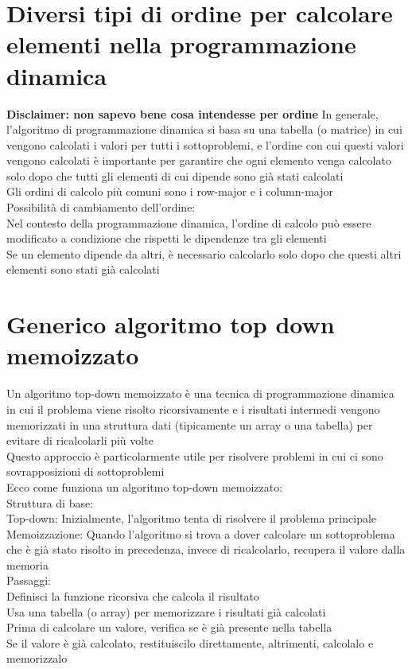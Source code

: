 \documentclass[12pt,oneside,a4paper]{article}
\begin{document}
\section{Diversi tipi di ordine per calcolare elementi nella programmazione dinamica}
\textbf{Disclaimer: non sapevo bene cosa intendesse per ordine}
In generale, l'algoritmo di programmazione dinamica si basa su una tabella (o matrice) in cui vengono calcolati i valori per tutti i sottoproblemi, e l'ordine con cui questi valori vengono calcolati è importante per garantire che ogni elemento venga calcolato solo dopo che tutti gli elementi di cui dipende sono già stati calcolati\\
Gli ordini di calcolo più comuni sono i row-major e i column-major\\
Possibilità di cambiamento dell'ordine:\\
Nel contesto della programmazione dinamica, l'ordine di calcolo può essere modificato a condizione che rispetti le dipendenze tra gli elementi\\
Se un elemento dipende da altri, è necessario calcolarlo solo dopo che questi altri elementi sono stati già calcolati
\section{Generico algoritmo top down memoizzato}
Un algoritmo top-down memoizzato è una tecnica di programmazione dinamica in cui il problema viene risolto ricorsivamente e i risultati intermedi vengono memorizzati in una struttura dati (tipicamente un array o una tabella) per evitare di ricalcolarli più volte\\
Questo approccio è particolarmente utile per risolvere problemi in cui ci sono sovrapposizioni di sottoproblemi\\
Ecco come funziona un algoritmo top-down memoizzato:\\
Struttura di base:\\
Top-down: Inizialmente, l'algoritmo tenta di risolvere il problema principale\\
Memoizzazione: Quando l'algoritmo si trova a dover calcolare un sottoproblema che è già stato risolto in precedenza, invece di ricalcolarlo, recupera il valore dalla memoria\\
Passaggi:\\
Definisci la funzione ricorsiva che calcola il risultato\\
Usa una tabella (o array) per memorizzare i risultati già calcolati\\
Prima di calcolare un valore, verifica se è già presente nella tabella\\
Se il valore è già calcolato, restituiscilo direttamente, altrimenti, calcolalo e memorizzalo
\end{document}
